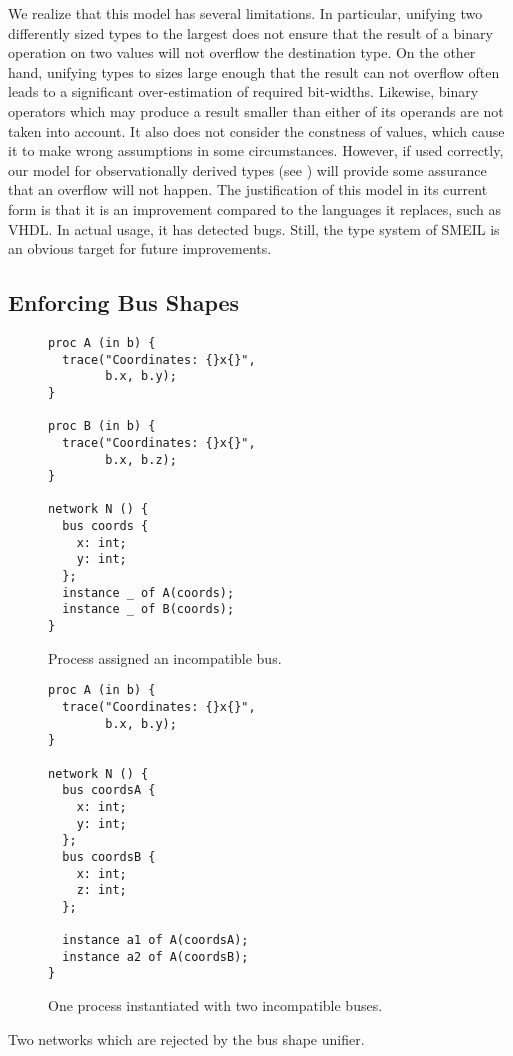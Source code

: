 We realize that this model has several limitations. In particular, unifying two
differently sized types to the largest does not ensure that the result of a
binary operation on two values will not overflow the destination type. On the
other hand, unifying types to sizes large enough that the result can not
overflow often leads to a significant over-estimation of required
bit-widths. Likewise, binary operators which may produce a result smaller than
either of its operands are not taken into account. It also does not consider the
constness of values, which cause it to make wrong assumptions in some
circumstances. However, if used correctly, our model for observationally derived
types (see ) will provide some assurance that an overflow will
not happen. The justification of this model in its current form is that it is an
improvement compared to the languages it replaces, such as VHDL. In actual
usage, it has detected bugs. Still, the type system of SMEIL is an obvious
target for future improvements.

\subsection{Enforcing Bus Shapes}
\begin{widefigure}
  \begin{subfigure}[t]{0.49\textwidth}
\begin{lstlisting}[language=smeil]
proc A (in b) {
  trace("Coordinates: {}x{}",
        b.x, b.y);
}

proc B (in b) {
  trace("Coordinates: {}x{}",
        b.x, b.z);
}

network N () {
  bus coords {
    x: int;
    y: int;
  };
  instance _ of A(coords);
  instance _ of B(coords);
}
\end{lstlisting}
    \caption{Process assigned an incompatible bus.}
    \label{fig:incom1}
   
  \end{subfigure}
\begin{subfigure}[t]{0.49\textwidth}  
\begin{lstlisting}[language=smeil]
proc A (in b) {
  trace("Coordinates: {}x{}",
        b.x, b.y);
}

network N () {
  bus coordsA {
    x: int;
    y: int;
  };
  bus coordsB {
    x: int;
    z: int;
  };

  instance a1 of A(coordsA);
  instance a2 of A(coordsB);
}
\end{lstlisting}
    \caption{One process instantiated with two incompatible buses.}
    \label{fig:incom2}
  \end{subfigure}
  \caption{Two networks which are rejected by the bus shape unifier.}
  \label{fig:busuni}
\end{widefigure}


